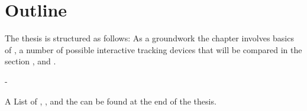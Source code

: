 \section{Outline}
The thesis is structured as follows:
As a groundwork the \textbf{} chapter involves basics of \textbf{}, a number of possible interactive tracking devices that will be compared in the section \textbf{}, and \textbf{}.

- 

A List of \textbf{}, \textbf{}, \textbf{} and the \textbf{}  can be found at the end of the thesis.

